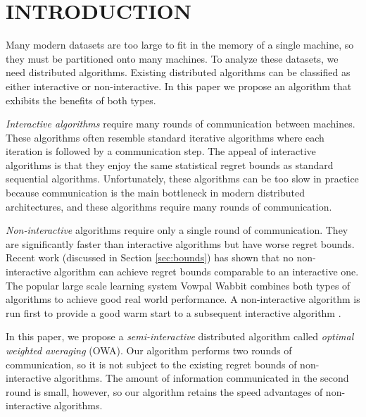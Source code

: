 \documentclass[twoside]{article}
\begin{document}



\section{INTRODUCTION}

Many modern datasets are too large to fit in the memory of a single machine,
so they must be partitioned onto many machines.
To analyze these datasets, we need distributed algorithms.
Existing distributed algorithms can be classified as either interactive or non-interactive.
In this paper we propose an algorithm that exhibits the benefits of both types.

\emph{Interactive algorithms} require many rounds of communication between machines.
These algorithms often resemble standard iterative algorithms where each iteration is followed by a communication step.
The appeal of interactive algorithms is that they enjoy the same statistical regret bounds as standard sequential algorithms.
Unfortunately, these algorithms can be too slow in practice because communication is the main bottleneck in modern distributed architectures,
and these algorithms require many rounds of communication.

\emph{Non-interactive} algorithms require only a single round of communication.
They are significantly faster than interactive algorithms
but have worse regret bounds.
Recent work (discussed in Section \ref{sec:bounds}) has shown that no non-interactive algorithm can achieve regret bounds comparable to an interactive one.
The popular large scale learning system Vowpal Wabbit combines both types of algorithms to achieve good real world performance.
A non-interactive algorithm is run first to provide a good warm start to a subsequent interactive algorithm \citep{vw,agarwal2014reliable}.

In this paper, we propose a \emph{semi-interactive} distributed algorithm called \emph{optimal weighted averaging} (OWA).
Our algorithm performs two rounds of communication,
so it is not subject to the existing regret bounds of non-interactive algorithms.
The amount of information communicated in the second round is small, however,
so our algorithm retains the speed advantages of non-interactive algorithms.
\end{document}
